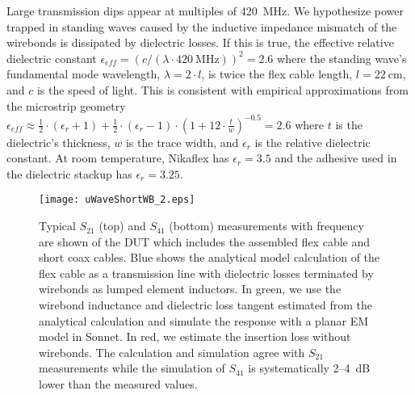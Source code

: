 Large transmission dips appear at multiples of 420~MHz. We hypothesize power trapped in standing waves caused by the inductive impedance mismatch of the wirebonds is dissipated by dielectric losses. If this is true, the effective relative dielectric constant $\epsilon_{eff} = (c/(\lambda \cdot 420~\textrm{MHz}))^{2} = 2.6$ where the standing wave's fundamental mode wavelength, $\lambda = 2 \cdot l$, is twice the flex cable length, $l=22~\textrm{cm}$, and $c$ is the speed of light. This is consistent with empirical approximations \parencite{Wadell} from the microstrip geometry $\epsilon_{eff} \approx \frac{1}{2} \cdot (\epsilon_{r} + 1) + \frac{1}{2} \cdot (\epsilon_{r} - 1) \cdot (1 + 12 \cdot \frac{t}{w})^{-0.5} = 2.6$ where $t$ is the dielectric's thickness, $w$ is the trace width, and $\epsilon_{r}$ is the relative dielectric constant. At room temperature, Nikaflex has $\epsilon_{r}=3.5$ and the adhesive used in the dielectric stackup has $\epsilon_{r}=3.25$. 

\begin{figure*}[!t]
    \centering
      \texttt{[image: uWaveShortWB\_2.eps]}
    \caption[Measured transmission and crosstalk for flex cable compared to simulation]{Typical $S_{21}$ (top) and $S_{41}$ (bottom) measurements with frequency are shown of the DUT which includes the assembled flex cable and short coax cables. Blue shows the analytical model calculation of the flex cable as a transmission line with dielectric losses terminated by wirebonds as lumped element inductors. In green, we use the wirebond inductance and dielectric loss tangent estimated from the analytical calculation and simulate the response with a planar EM model in Sonnet. In red, we estimate the insertion loss without wirebonds. The calculation and simulation agree with $S_{21}$ measurements while the simulation of $S_{41}$ is systematically 2--4~dB lower than the measured values.}
    \label{fig:Measurements}
\end{figure*}


